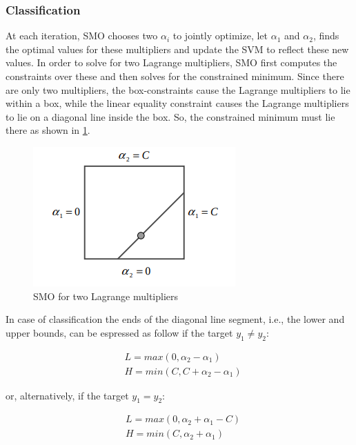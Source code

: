 \subsubsection{Classification}

At each iteration, SMO chooses two $\alpha_i$ to jointly optimize, let $\alpha_1$ and $\alpha_2$, finds the optimal values for these multipliers and update the SVM to reflect these new values. In order to solve for two Lagrange multipliers, SMO first computes the constraints over these and then solves for the constrained minimum. Since there are only two multipliers, the box-constraints cause the Lagrange multipliers to lie within a box, while the linear equality constraint causes the Lagrange multipliers to lie on a diagonal line inside the box. So, the constrained minimum must lie there as shown in \ref{fig:smo_lagrange_multipliers}.

\begin{figure}[h!]
	\centering
	\includegraphics[scale=0.5]{img/smo_multipliers.png}
	\caption{SMO for two Lagrange multipliers}
	\label{fig:smo_lagrange_multipliers}
\end{figure}

In case of classification the ends of the diagonal line segment, i.e., the lower and upper bounds, can be espressed as follow if the target $y_1 \ne y_2$:

\begin{equation} \label{eq:smo_svc_bounds_update1}
	\begin{aligned}
		& L = max(0, \alpha_2 - \alpha_1) \\
		& H = min(C, C + \alpha_2 - \alpha_1)
	\end{aligned}
\end{equation}

or, alternatively, if the target $y_1 = y_2$:

\begin{equation} \label{eq:smo_svc_bounds_update2}
	\begin{aligned}
		& L = max(0, \alpha_2 + \alpha_1 - C) \\
		& H = min(C, \alpha_2 + \alpha_1)
	\end{aligned}
\end{equation}

